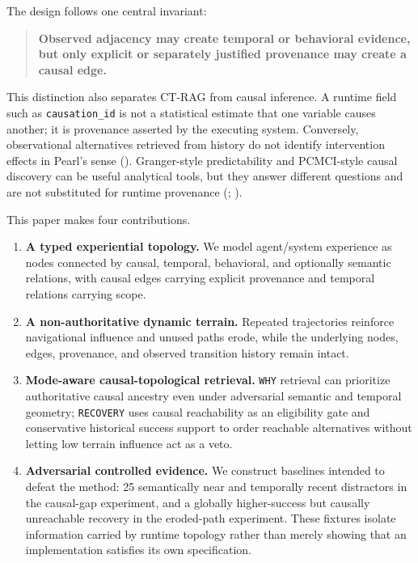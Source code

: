 \documentclass[
  11pt,
]{article}
\providecommand{\tightlist}{%
  \setlength{\itemsep}{0pt}\setlength{\parskip}{0pt}}
\begin{document}
The design follows one central invariant:

\begin{quote}
\textbf{Observed adjacency may create temporal or behavioral evidence,
but only explicit or separately justified provenance may create a causal
edge.}
\end{quote}

This distinction also separates CT-RAG from causal inference. A runtime
field such as \texttt{causation\_id} is not a statistical estimate that
one variable causes another; it is provenance asserted by the executing
system. Conversely, observational alternatives retrieved from history do
not identify intervention effects in Pearl's sense
(). Granger-style
predictability and PCMCI-style causal discovery can be useful analytical
tools, but they answer different questions and are not substituted for
runtime provenance (;
).

This paper makes four contributions.

\begin{enumerate}
\def\labelenumi{\arabic{enumi}.}
\tightlist
\item
  \textbf{A typed experiential topology.} We model agent/system
  experience as nodes connected by causal, temporal, behavioral, and
  optionally semantic relations, with causal edges carrying explicit
  provenance and temporal relations carrying scope.
\item
  \textbf{A non-authoritative dynamic terrain.} Repeated trajectories
  reinforce navigational influence and unused paths erode, while the
  underlying nodes, edges, provenance, and observed transition history
  remain intact.
\item
  \textbf{Mode-aware causal-topological retrieval.} \texttt{WHY}
  retrieval can prioritize authoritative causal ancestry even under
  adversarial semantic and temporal geometry; \texttt{RECOVERY} uses
  causal reachability as an eligibility gate and conservative historical
  success support to order reachable alternatives without letting low
  terrain influence act as a veto.
\item
  \textbf{Adversarial controlled evidence.} We construct baselines
  intended to defeat the method: 25 semantically near and temporally
  recent distractors in the causal-gap experiment, and a globally
  higher-success but causally unreachable recovery in the eroded-path
  experiment. These fixtures isolate information carried by runtime
  topology rather than merely showing that an implementation satisfies
  its own specification.
\end{enumerate}
\end{document}
